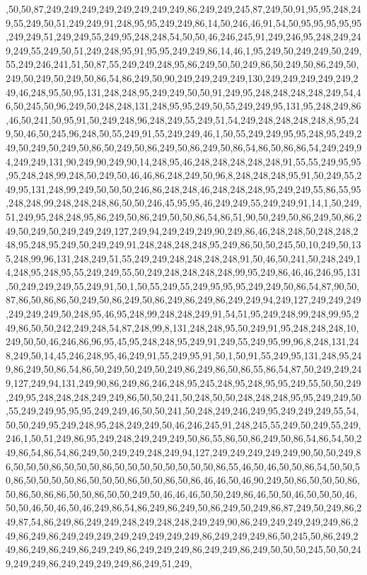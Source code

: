 ,50,50,87,249,249,249,249,249,249,249,249,86,249,249,245,87,249,50,91,95,95,248,249,55,249,50,51,249,249,91,248,95,95,249,249,86,14,50,246,46,91,54,50,95,95,95,95,95,249,249,51,249,249,55,249,95,248,248,54,50,50,46,246,245,91,249,246,95,248,249,249,249,55,249,50,51,249,248,95,91,95,95,249,249,86,14,46,1,95,249,50,249,249,50,249,55,249,246,241,51,50,87,55,249,249,248,95,86,249,50,50,249,86,50,249,50,86,249,50,249,50,249,50,249,50,86,54,86,249,50,90,249,249,249,249,130,249,249,249,249,249,249,46,248,95,50,95,131,248,248,95,249,249,50,50,91,249,95,248,248,248,248,249,54,46,50,245,50,96,249,50,248,248,131,248,95,95,249,50,55,249,249,95,131,95,248,249,86,46,50,241,50,95,91,50,249,248,96,248,249,55,249,51,54,249,248,248,248,248,8,95,249,50,46,50,245,96,248,50,55,249,91,55,249,249,46,1,50,55,249,249,95,95,248,95,249,249,50,249,50,249,50,86,50,249,50,86,249,50,86,249,50,86,54,86,50,86,86,54,249,249,94,249,249,131,90,249,90,249,90,14,248,95,46,248,248,248,248,248,91,55,55,249,95,95,95,248,248,99,248,50,249,50,46,46,86,248,249,50,96,8,248,248,248,95,91,50,249,55,249,95,131,248,99,249,50,50,50,246,86,248,248,46,248,248,248,95,249,249,55,86,55,95,248,248,99,248,248,248,86,50,50,246,45,95,95,46,249,249,55,249,249,91,14,1,50,249,51,249,95,248,248,95,86,249,50,86,249,50,50,86,54,86,51,90,50,249,50,86,249,50,86,249,50,249,50,249,249,249,127,249,94,249,249,249,90,249,86,46,248,248,50,248,248,248,95,248,95,249,50,249,249,91,248,248,248,248,95,249,86,50,50,245,50,10,249,50,135,248,99,96,131,248,249,51,55,249,249,248,248,248,248,91,50,46,50,241,50,248,249,14,248,95,248,95,55,249,249,55,50,249,248,248,248,248,99,95,249,86,46,46,246,95,131,50,249,249,249,55,249,91,50,1,50,55,249,55,249,95,95,95,249,249,50,86,54,87,90,50,87,86,50,86,86,50,249,50,86,249,50,86,249,86,249,86,249,249,94,249,127,249,249,249,249,249,249,50,248,95,46,95,248,99,248,248,249,91,54,51,95,249,248,99,248,99,95,249,86,50,50,242,249,248,54,87,248,99,8,131,248,248,95,50,249,91,95,248,248,248,10,249,50,50,46,246,86,96,95,45,95,248,248,95,249,91,249,55,249,95,99,96,8,248,131,248,249,50,14,45,246,248,95,46,249,91,55,249,95,91,50,1,50,91,55,249,95,131,248,95,249,86,249,50,86,54,86,50,249,50,249,50,249,86,249,86,50,86,55,86,54,87,50,249,249,249,127,249,94,131,249,90,86,249,86,246,248,95,245,248,95,248,95,95,249,55,50,50,249,249,95,248,248,248,249,249,86,50,50,241,50,248,50,50,248,248,248,95,95,249,249,50,55,249,249,95,95,95,249,249,46,50,50,241,50,248,249,246,249,95,249,249,249,55,54,50,50,249,95,249,248,95,248,249,249,50,46,246,245,91,248,245,55,249,50,249,55,249,246,1,50,51,249,86,95,249,248,249,249,249,50,86,55,86,50,86,249,50,86,54,86,54,50,249,86,54,86,54,86,249,50,249,249,248,249,94,127,249,249,249,249,249,90,50,50,249,86,50,50,50,86,50,50,50,86,50,50,50,50,50,50,50,50,86,55,46,50,46,50,50,86,54,50,50,50,86,50,50,50,50,86,50,50,50,86,50,50,86,50,86,46,46,50,46,90,249,50,86,50,50,50,86,50,86,50,86,86,50,50,86,50,50,249,50,46,46,46,50,50,249,86,46,50,50,46,50,50,50,46,50,50,46,50,46,50,46,249,86,54,86,249,86,249,50,86,249,50,249,86,87,249,50,249,86,249,87,54,86,249,86,249,249,248,249,248,248,249,249,90,86,249,249,249,249,249,86,249,86,249,86,249,249,249,249,249,249,249,249,86,249,249,249,86,50,245,50,86,249,249,86,249,86,249,86,249,249,86,249,249,249,86,249,249,86,249,50,50,50,245,50,50,249,249,249,86,249,249,249,249,86,249,51,249,